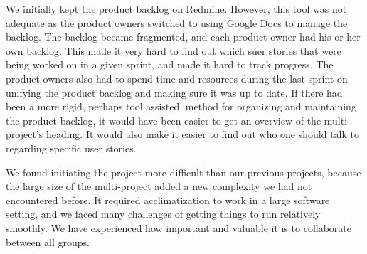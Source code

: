 We initially kept the product backlog on Redmine. However, this tool was not adequate as the product owners switched to using Google Docs to manage the backlog. The backlog became fragmented, and each product owner had his or her own backlog. This made it very hard to find out which suer stories that were being worked on in a given sprint, and made it hard to track progress. The product owners also had to spend time and resources during the last sprint on unifying the product backlog and making sure it was up to date. If there had been a more rigid, perhaps tool assisted, method for organizing and maintaining the product backlog, it would have been easier to get an overview of the multi-project's heading. It would also make it easier to find out who one should talk to regarding specific user stories.  

We found initiating the project more difficult than our previous projects, because the large size of the multi-project added a new complexity we had not encountered before. It required acclimatization to work in a large software setting, and we faced many challenges of getting things to run relatively smoothly. We have experienced how important and valuable it is to collaborate between all groups.
  
